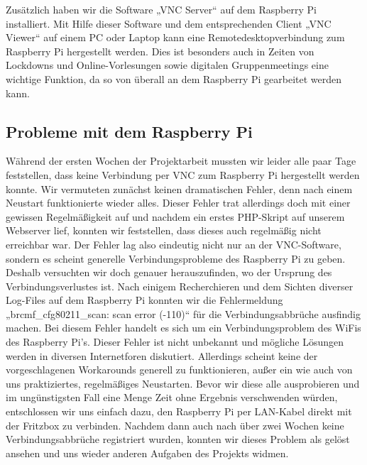 Zusätzlich haben wir die Software „VNC Server“ auf dem Raspberry Pi installiert. Mit Hilfe dieser Software und dem entsprechenden Client „VNC Viewer“ auf einem PC oder Laptop kann eine Remotedesktopverbindung zum Raspberry Pi hergestellt werden. Dies ist besonders auch in Zeiten von Lockdowns und Online-Vorlesungen sowie digitalen Gruppenmeetings eine wichtige Funktion, da so von überall an dem Raspberry Pi gearbeitet werden kann.

\subsection{Probleme mit dem Raspberry Pi}
Während der ersten Wochen der Projektarbeit mussten wir leider alle paar Tage feststellen, dass keine Verbindung per VNC zum Raspberry Pi hergestellt werden konnte. Wir vermuteten zunächst keinen dramatischen Fehler, denn nach einem Neustart funktionierte wieder alles. Dieser Fehler trat allerdings doch mit einer gewissen Regelmäßigkeit auf und nachdem ein erstes PHP-Skript auf unserem Webserver lief, konnten wir feststellen, dass dieses auch regelmäßig nicht erreichbar war. Der Fehler lag also eindeutig nicht nur an der VNC-Software, sondern es scheint generelle Verbindungsprobleme des Raspberry Pi zu geben.
Deshalb versuchten wir doch genauer herauszufinden, wo der Ursprung des Verbindungsverlustes ist. Nach einigem Recherchieren und dem Sichten diverser Log-Files auf dem Raspberry Pi konnten wir die Fehlermeldung „brcmf\_cfg80211\_scan: scan error (-110)“ für die Verbindungsabbrüche ausfindig machen. Bei diesem Fehler handelt es sich um ein Verbindungsproblem des WiFis des Raspberry Pi’s. Dieser Fehler ist nicht unbekannt und mögliche Lösungen werden in diversen Internetforen diskutiert. Allerdings scheint keine der vorgeschlagenen Workarounds generell zu funktionieren, außer ein wie auch von uns praktiziertes, regelmäßiges Neustarten. Bevor wir diese alle ausprobieren und im ungünstigsten Fall eine Menge Zeit ohne Ergebnis verschwenden würden, entschlossen wir uns einfach dazu, den Raspberry Pi per LAN-Kabel direkt mit der Fritzbox zu verbinden. Nachdem dann auch nach über zwei Wochen keine Verbindungsabbrüche registriert wurden, konnten wir dieses Problem als gelöst ansehen und uns wieder anderen Aufgaben des Projekts widmen.

